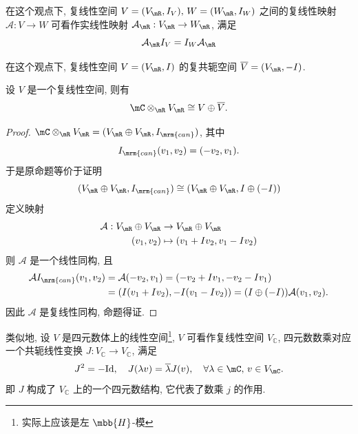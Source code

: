 在这个观点下, 复线性空间 $V = (V_\mR,I_V),\,W = (W_\mR,I_W)$ 之间的复线性映射 $\mathcal{A}:V\rightarrow W$ 可看作实线性映射
$\mathcal{A}_{\mR}:V_{\mR}\rightarrow W_{\mR}$, 满足
\begin{equation*}
    \mathcal{A}_{\mR}I_V = I_W\mathcal{A}_{\mR}
\end{equation*}

在这个观点下, 复线性空间 $V = (V_{\mR}, I)$ 的复共轭空间 $\overline{V} = (V_{\mR}, -I)$.

\begin{proposition}
    设 $V$ 是一个复线性空间, 则有
    \begin{equation*}
        \mC\otimes_{\mR} V_{\mR} \cong V\oplus \overline{V}.
    \end{equation*}
\end{proposition}
\begin{proof}
    $\mC\otimes_{\mR} V_{\mR} = (V_{\mR}\oplus V_{\mR},I_{\mrm{can}})$, 其中
    \begin{equation*}
        I_{\mrm{can}}(v_1,v_2) = (-v_2, v_1).
    \end{equation*}
    于是原命题等价于证明
    \begin{equation*}
        (V_{\mR}\oplus V_{\mR},I_{\mrm{can}}) \cong (V_{\mR}\oplus V_{\mR}, I\oplus(-I))
    \end{equation*}
    定义映射
    \begin{align*}
        \mathcal{A}:V_{\mR}\oplus V_{\mR}&\rightarrow V_{\mR}\oplus V_{\mR} \\
        (v_1,v_2)&\mapsto (v_1+Iv_2, v_1 - Iv_2)
    \end{align*}
    则 $\mathcal{A}$ 是一个线性同构, 且
    \begin{align*}
        \mathcal{A}I_{\mrm{can}}(v_1,v_2) &= \mathcal{A}(-v_2, v_1) = (-v_2 + Iv_1, -v_2 - Iv_1) \\
        &= (I(v_1 + Iv_2),-I(v_1 - Iv_2)) = (I\oplus(-I))\mathcal{A}(v_1,v_2).
    \end{align*}
    因此 $\mathcal{A}$ 是复线性同构, 命题得证.
\end{proof}

类似地, 设 $V$ 是四元数体上的线性空间\footnote{实际上应该是左 $\mbb{H}$-模}, $V$ 可看作复线性空间 $V_{\mathbb{C}}$, 
四元数数乘对应一个共轭线性变换 $J:V_{\mathbb{C}}\rightarrow V_{\mathbb{C}}$, 满足
\begin{equation*}
    J^2 = -\mathrm{Id},\quad J(\lambda v) = \overline{\lambda}J(v),\quad \forall \lambda\in\mC,\,v\in V_{\mC}.
\end{equation*}
即 $J$ 构成了 $V_{\mathbb{C}}$ 上的一个四元数结构, 它代表了数乘 $j$ 的作用. 

